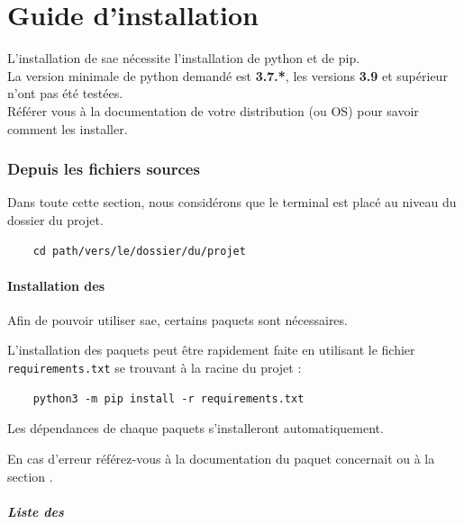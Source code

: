 \part{Guide d'installation}

L'installation de \gls{sae} nécessite l'installation de \gls{python} et de \gls{pip}.\\
La version minimale de \gls{python} demandé est \textbf{3.7.*}, les versions \textbf{3.9} et supérieur n'ont pas été
testées.\\
Référer vous à la documentation de votre distribution (ou OS) pour savoir comment les installer.

\section{Depuis les fichiers sources}

Dans toute cette section, nous considérons que le terminal est placé au niveau du dossier du projet.

\begin{verbatim}
    cd path/vers/le/dossier/du/projet
\end{verbatim}

\subsection{Installation des }

Afin de pouvoir utiliser \gls{sae}, certains \glspl{paquet} sont nécessaires.\newline

L'installation des \glspl{paquet} peut être rapidement faite en utilisant le fichier \texttt{requirements.txt} se
trouvant à la racine du projet :

\begin{verbatim}
    python3 -m pip install -r requirements.txt
\end{verbatim}

Les dépendances de chaque \glspl{paquet} s'installeront automatiquement.\newline

En cas d'erreur référez-vous à la documentation du \gls{paquet} concernait ou à la section .

\subsubsection{Liste des }
\label{sec:listePackages}


